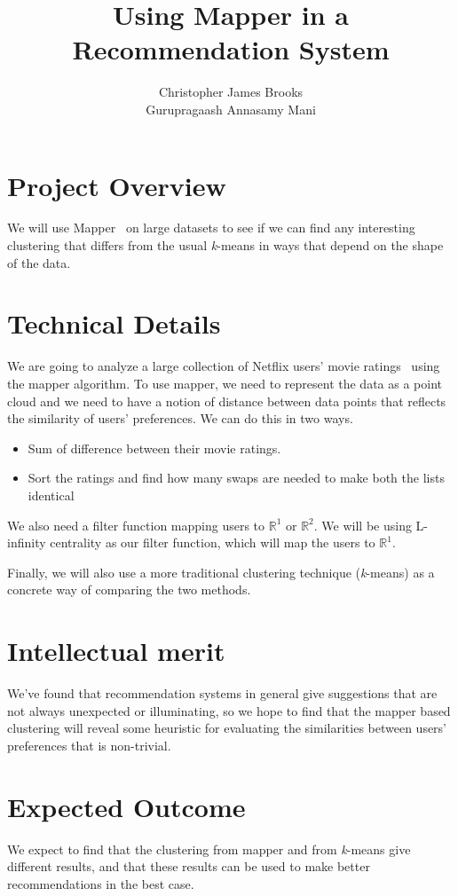 \documentclass[12pt]{article}
\begin{document}
\title {Using Mapper in a Recommendation System}

\author{
Christopher James Brooks\\ 
Gurupragaash Annasamy Mani}

\maketitle

\section{Project Overview}
We will use Mapper~\cite{Lum2013} on large datasets to see if we can find any interesting clustering that differs from the usual \textit{k}-means in ways that depend on the shape of the data.

\section{Technical Details}
We are going to analyze a large collection of Netflix users' movie ratings~\cite{Netflix} using the mapper algorithm. To use mapper, we need to represent the data as a point cloud and we need to have a notion of distance between data points that reflects the similarity of users' preferences. We can do this in two ways. 
\begin{itemize}
  \item Sum of difference between their movie ratings.
  \item Sort the ratings and find how many swaps are needed to make both the lists identical 
\end{itemize}
We also need a filter function mapping users to $\mathbb{R}^1$ or $\mathbb{R}^2$. We will be using L-infinity centrality as our filter function, which will map the users to $\mathbb{R}^1$. 

Finally, we will also use a more traditional clustering technique (\textit{k}-means) as a concrete way of comparing the two methods.

\section{Intellectual merit}
We've found that recommendation systems in general give suggestions that are not always unexpected or illuminating, so we hope to find that the mapper based clustering will reveal some heuristic for evaluating the similarities between users' preferences that is non-trivial.

\section{Expected Outcome}
We expect to find that the clustering from mapper and from \textit{k}-means give different results, and that these results can be used to make better recommendations in the best case.



\end{document}
